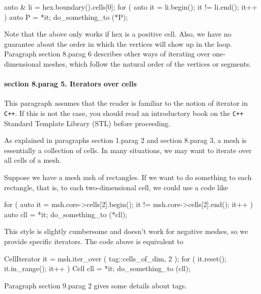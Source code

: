 {\verbatim
   auto & li = hex.boundary().cells[0];
   for ( auto it = li.begin(); it != li.end(); it++ )
   { auto P = *it;  do_something_to (*P);  }
\endverbatim

Note that the above only works if {\codett hex} is a positive cell.
Also, we have no guarantee about the order in which the vertices will show up in the loop.
Paragraph \numb section 8.\numb parag 6 describes other ways of iterating over one-dimensional
meshes, which follow the natural order of the vertices or segments.


\paragraph{\numb section 8.\numb parag 5. Iterators over cells}

This paragraph assumes that the reader is familiar to the notion of iterator in {\tt C++}.
If this is not the case, you should read an introductory book on the {\tt C++}
Standard Template Library (STL) before proceeding.

As explained in paragraphs \numb section 1.\numb parag 2 and \numb section 8.\numb parag 3,
a mesh is essentially a collection of cells.
In many situations, we may want to iterate over all cells of a mesh.

Suppose we have a mesh {\codett msh} of rectangles.
If we want to do something to each rectangle, that is, to each two-dimensional cell,
we could use a code like

\verbatim
   for ( auto it = msh.core->cells[2].begin();
              it != msh.core->cells[2].end(); it++ )
   {  auto cll = *it;  do_something_to (*cll);  }
\endverbatim

This style is slightly cumbersome and doesn't work for negative meshes,
so we provide specific iterators.
The code above is equivalent to

\verbatim
   CellIterator it = msh.iter_over ( tag::cells_of_dim, 2 );
   for ( it.reset(); it.in_range(); it++ )
   {  Cell cll = *it;  do_something_to (cll);  }
\endverbatim

Paragraph \numb section 9.\numb parag 2 gives some details about tags.

}
